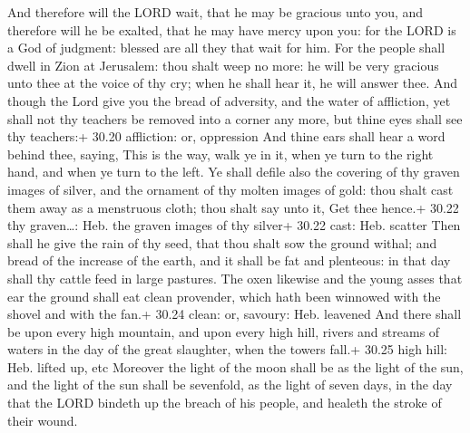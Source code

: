  And therefore will the LORD wait, that he may be
gracious unto you, and therefore will he be exalted, that he may have
mercy upon you: for the LORD is a God of judgment: blessed are all they
that wait for him.  For the people shall dwell in Zion at
Jerusalem: thou shalt weep no more: he will be very gracious unto thee
at the voice of thy cry; when he shall hear it, he will answer thee.
 And though the Lord give you the bread of adversity, and
the water of affliction, yet shall not thy teachers be removed into a
corner any more, but thine eyes shall see thy teachers:+ 30.20
affliction: or, oppression  And thine ears shall hear a
word behind thee, saying, This is the way, walk ye in it, when ye turn
to the right hand, and when ye turn to the left.  Ye shall
defile also the covering of thy graven images of silver, and the
ornament of thy molten images of gold: thou shalt cast them away as a
menstruous cloth; thou shalt say unto it, Get thee hence.+ 30.22 thy
graven\ldots: Heb. the graven images of thy silver+ 30.22 cast: Heb.
scatter  Then shall he give the rain of thy seed, that thou
shalt sow the ground withal; and bread of the increase of the earth, and
it shall be fat and plenteous: in that day shall thy cattle feed in
large pastures.  The oxen likewise and the young asses that
ear the ground shall eat clean provender, which hath been winnowed with
the shovel and with the fan.+ 30.24 clean: or, savoury: Heb. leavened
 And there shall be upon every high mountain, and upon
every high hill, rivers and streams of waters in the day of the great
slaughter, when the towers fall.+ 30.25 high hill: Heb. lifted up, etc
 Moreover the light of the moon shall be as the light of
the sun, and the light of the sun shall be sevenfold, as the light of
seven days, in the day that the LORD bindeth up the breach of his
people, and healeth the stroke of their wound.

